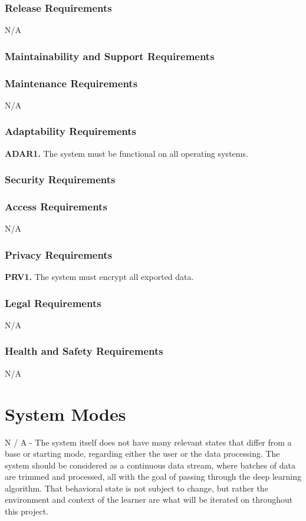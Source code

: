 \documentclass[12pt, titlepage]{article}
\begin{document}
\subsubsection{Release Requirements}
N/A

\subsubsection{Maintainability and Support Requirements}
\subsubsection{Maintenance Requirements}
N/A

\subsubsection{Adaptability Requirements}
\textbf{ADAR1.} The system must be functional on all operating systems.

\subsubsection{Security Requirements}

\subsubsection{Access Requirements}
N/A

\subsubsection{Privacy Requirements}
\textbf{PRV1.} The system must encrypt all exported data.


\subsubsection{Legal Requirements}
N/A

\subsubsection{Health and Safety Requirements}
N/A


\section{System Modes}
N / A - The system itself does not have many relevant states that differ from a base or starting mode, regarding either the user or the data processing. The system should be considered as a continuous data stream, where batches of data are trimmed and processed, all with the goal of passing through the deep learning algorithm. That behavioral state is not subject to change, but rather the environment and context of the learner are what will be iterated on throughout this project.
\end{document}

